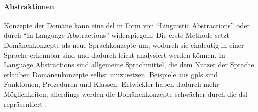     \paragraph{Abstraktionen}
    Konzepte der Domäne kann eine \gls{dsl} in Form von
    "`Linguistic Abstractions"' oder durch "`In-Language Abstractions"'
    widerspiegeln.
    Die erste Methode setzt Domänenkonzepte als neue Sprachkonzepte um,
    wodurch sie eindeutig in einer Sprache erkennbar sind
    und dadurch leicht analysiert werden können.
    In-Language Abstractions sind allgemeine Sprachmittel,
    die dem Nutzer der Sprache erlauben Domänenkonzepte selbst umzusetzen.
    Beispiele aus \glspl{gpl} sind Funktionen, Prozeduren und Klassen.
    Entwickler haben dadurch mehr Möglichkeiten,
    allerdings werden die Domänenkonzepte schwächer durch die \gls{dsl}
    repräsentiert
    \cite[Kapitel 4.1.2]{voelter:DslEngineering}.